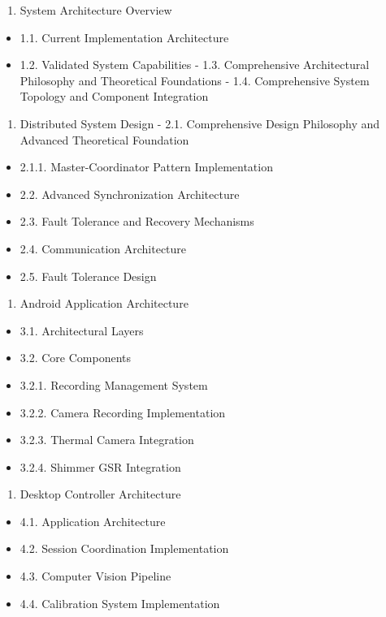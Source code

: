 \documentclass[12pt,a4paper]{report}
\begin{document}
\begin{enumerate}
\item System Architecture Overview
\end{enumerate}
\begin{itemize}
\item 1.1. Current Implementation Architecture
\item 1.2. Validated System Capabilities
    -
    1.3. Comprehensive Architectural Philosophy and Theoretical Foundations
    -
    1.4. Comprehensive System Topology and Component Integration
\end{itemize}
\begin{enumerate}
\item Distributed System Design
    -
    2.1. Comprehensive Design Philosophy and Advanced Theoretical Foundation
\end{enumerate}
\begin{itemize}
\item 2.1.1. Master-Coordinator Pattern Implementation
\item 2.2. Advanced Synchronization Architecture
\item 2.3. Fault Tolerance and Recovery Mechanisms
\item 2.4. Communication Architecture
\item 2.5. Fault Tolerance Design
\end{itemize}
\begin{enumerate}
\item Android Application Architecture
\end{enumerate}
\begin{itemize}
\item 3.1. Architectural Layers
\item 3.2. Core Components
\item 3.2.1. Recording Management System
\item 3.2.2. Camera Recording Implementation
\item 3.2.3. Thermal Camera Integration
\item 3.2.4. Shimmer GSR Integration
\end{itemize}
\begin{enumerate}
\item Desktop Controller Architecture
\end{enumerate}
\begin{itemize}
\item 4.1. Application Architecture
\item 4.2. Session Coordination Implementation
\item 4.3. Computer Vision Pipeline
\item 4.4. Calibration System Implementation
\end{itemize}
\end{document}
